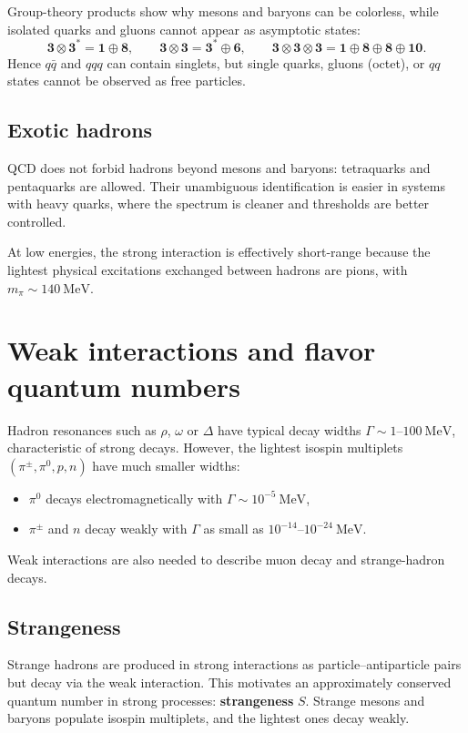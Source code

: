 Group-theory products show why mesons and baryons can be colorless, while isolated quarks
and gluons cannot appear as asymptotic states:
\begin{equation}
\mathbf{3}\otimes \mathbf{3}^\ast = \mathbf{1}\oplus \mathbf{8},\qquad
\mathbf{3}\otimes \mathbf{3} = \mathbf{3}^\ast \oplus \mathbf{6},\qquad
\mathbf{3}\otimes \mathbf{3}\otimes \mathbf{3} = \mathbf{1}\oplus \mathbf{8}\oplus \mathbf{8}\oplus \mathbf{10}.
\end{equation}
Hence $q\bar q$ and $qqq$ can contain singlets, but single quarks, gluons (octet), or $qq$ states
cannot be observed as free particles.

\subsection{Exotic hadrons}
QCD does not forbid hadrons beyond mesons and baryons: tetraquarks and pentaquarks are allowed.
Their unambiguous identification is easier in systems with heavy quarks, where the spectrum is
cleaner and thresholds are better controlled.

At low energies, the strong interaction is effectively short-range because the lightest
physical excitations exchanged between hadrons are pions, with $m_\pi \sim 140~\text{MeV}$.

\section{Weak interactions and flavor quantum numbers}
Hadron resonances such as $\rho$, $\omega$ or $\Delta$ have typical decay widths
$\Gamma \sim 1$--$100~\text{MeV}$, characteristic of strong decays.
However, the lightest isospin multiplets $(\pi^\pm,\pi^0,p,n)$ have much smaller widths:
\begin{itemize}
  \item $\pi^0$ decays electromagnetically with $\Gamma \sim 10^{-5}~\text{MeV}$,
  \item $\pi^\pm$ and $n$ decay weakly with $\Gamma$ as small as $10^{-14}$--$10^{-24}~\text{MeV}$.
\end{itemize}
Weak interactions are also needed to describe muon decay and strange-hadron decays.

\subsection{Strangeness}
Strange hadrons are produced in strong interactions as particle--antiparticle pairs
but decay via the weak interaction. This motivates an approximately conserved quantum number
in strong processes: \textbf{strangeness} $S$.
Strange mesons and baryons populate isospin multiplets, and the lightest ones decay weakly.

